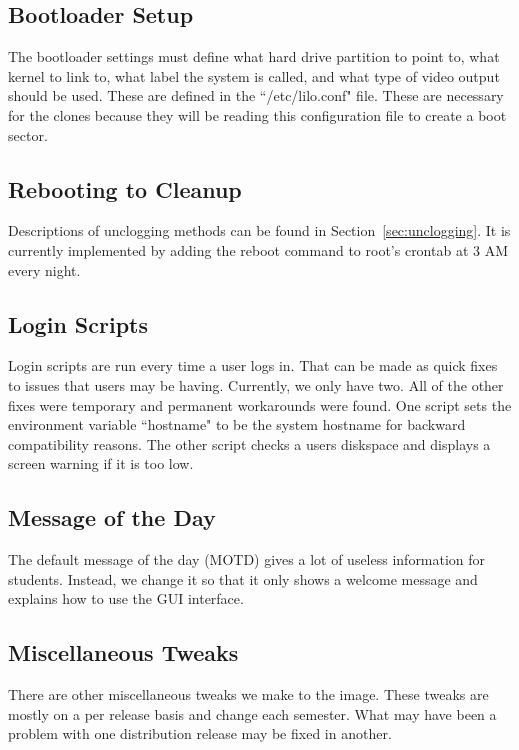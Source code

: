 \subsection{Bootloader Setup}
The bootloader settings must define what hard drive partition to point to, what kernel to link to, what label the system is called, and what type of video output should be used.  These are defined in the ``/etc/lilo.conf" file.  These are necessary for the clones because they will be reading this configuration file to create a boot sector.

\subsection{Rebooting to Cleanup}
Descriptions of unclogging methods can be found in Section~\ref{sec:unclogging}.  It is currently implemented by adding the reboot command to root's crontab at 3 AM every night.  

\subsection{Login Scripts}
Login scripts are run every time a user logs in.  That can be made as quick fixes to issues that users may be having.  Currently, we only have two.  All of the other fixes were temporary and permanent workarounds were found.  One script sets the environment variable ``hostname" to be the system hostname for backward compatibility reasons.  The other script checks a users diskspace and displays a screen warning if it is too low.  

\subsection{Message of the Day}
The default message of the day (MOTD) gives a lot of useless information for students.  Instead, we change it so that it only shows a welcome message and explains how to use the GUI interface.  

\subsection{Miscellaneous Tweaks}
There are other miscellaneous tweaks we make to the image.  These tweaks are mostly on a per release basis and change each semester.  What may have been a problem with one distribution release may be fixed in another.  

